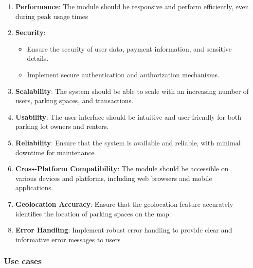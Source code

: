 \begin{enumerate}
    \item \textbf{Performance}: The module should be responsive and perform eﬀiciently, even during
    peak usage times
    \item \textbf{Security}:
        \begin{itemize}
            \item Ensure the security of user data, payment information, and sensitive details.
            \item Implement secure authentication and authorization mechanisms.
        \end{itemize}
    \item \textbf{Scalability}: The system should be able to scale with an increasing number of users,
    parking spaces, and transactions.
    \item \textbf{Usability}: The user interface should be intuitive and user-friendly for both parking
    lot owners and renters.
    \item \textbf{Reliability}: Ensure that the system is available and reliable, with minimal downtime
    for maintenance.
    \item \textbf{Cross-Platform Compatibility}: The module should be accessible on various devices
    and platforms, including web browsers and mobile applications.
    \item \textbf{Geolocation Accuracy}: Ensure that the geolocation feature accurately identifies the
    location of parking spaces on the map.
    \item \textbf{Error Handling}: Implement robust error handling to provide clear and informative
    error messages to users
\end{enumerate}

\subsubsection{Use cases}

